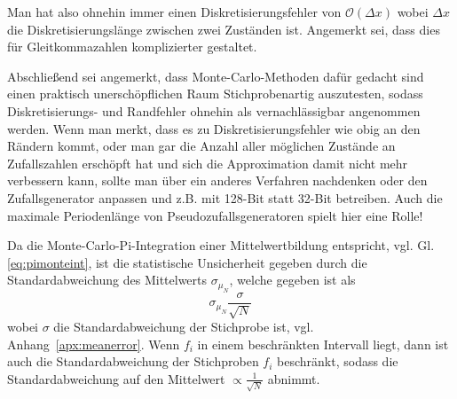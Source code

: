 Man hat also ohnehin immer einen Diskretisierungsfehler von $\mathcal{O}\left(\Delta x\right)$ wobei $\Delta x$ die Diskretisierungslänge zwischen zwei Zuständen ist. Angemerkt sei, dass dies für Gleitkommazahlen komplizierter gestaltet.

Abschließend sei angemerkt, dass Monte-Carlo-Methoden dafür gedacht sind einen praktisch unerschöpflichen Raum Stichprobenartig auszutesten, sodass Diskretisierungs- und Randfehler ohnehin als vernachlässigbar angenommen werden. Wenn man merkt, dass es zu Diskretisierungsfehler wie obig an den Rändern kommt, oder man gar die Anzahl aller möglichen Zustände an Zufallszahlen erschöpft hat und sich die Approximation damit nicht mehr verbessern kann, sollte man über ein anderes Verfahren nachdenken oder den Zufallsgenerator anpassen und z.B. mit 128-Bit statt 32-Bit betreiben. Auch die maximale Periodenlänge von Pseudozufallsgeneratoren spielt hier eine Rolle!
%

Da die Monte-Carlo-Pi-Integration einer Mittelwertbildung entspricht, vgl. Gl.\ref{eq:pimonteint}, ist die statistische Unsicherheit gegeben durch die Standardabweichung des Mittelwerts $\sigma_{\mu_N}$, welche gegeben ist als
\begin{equation}
	\sigma_{\mu_N} \frac{\sigma}{\sqrt{N}}
\end{equation}
wobei $\sigma$ die Standardabweichung der Stichprobe ist, vgl. Anhang~\ref{apx:meanerror}.
Wenn $f_i$ in einem beschränkten Intervall liegt, dann ist auch die Standardabweichung der Stichproben $f_i$ beschränkt, sodass die Standardabweichung auf den Mittelwert $\propto \frac{1}{\sqrt{N}}$ abnimmt.

